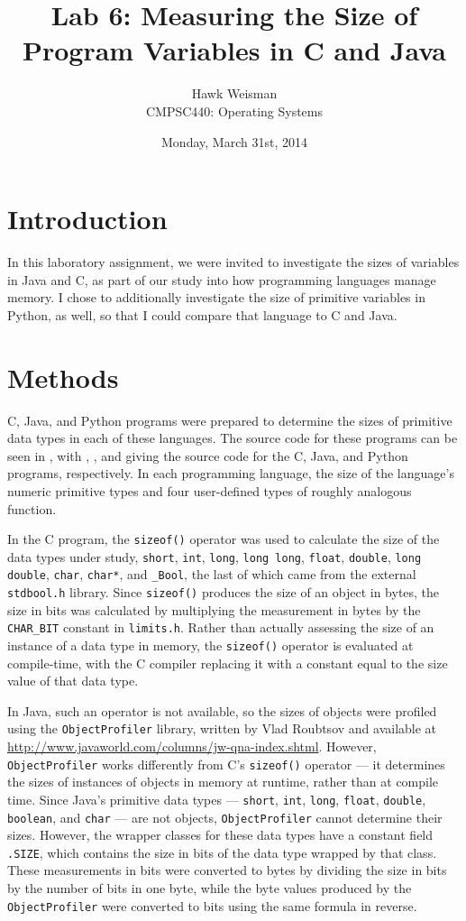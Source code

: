 \documentclass[12pt,letterpaper]{article}
\author{Hawk Weisman\\CMPSC440: Operating Systems}
\title{Lab 6: Measuring the Size of Program Variables in C and Java}
\date{Monday, March 31st, 2014}
\begin{document}
	\maketitle
	\section {Introduction}

		In this laboratory assignment, we were invited to investigate the sizes of variables in Java and C, as part of our study into how programming languages manage memory. I chose to additionally investigate the size of primitive variables in Python, as well, so that I could compare that language to C and Java.

	\section {Methods}
		
		C, Java, and Python programs were prepared to determine the sizes of primitive data types in each of these languages. The source code for these programs can be seen in , with , , and  giving the source code for the C, Java, and Python programs, respectively. In each programming language, the size of the language's numeric primitive types and four user-defined types of roughly analogous function.

		In the C program, the \texttt{sizeof()} operator was used to calculate the size of the data types under study, \texttt{short}, \texttt{int}, \texttt{long}, \texttt{long long}, \texttt{float}, \texttt{double}, \texttt{long double}, \texttt{char}, \texttt{char*}, and \texttt{\_Bool}, the last of which came from the external \texttt{stdbool.h} library. Since \texttt{sizeof()} produces the size of an object in bytes, the size in bits was calculated by multiplying the measurement in bytes by the \texttt{CHAR\_BIT} constant in \texttt{limits.h}. Rather than actually assessing the size of an instance of a data type in memory, the \texttt{sizeof()} operator is evaluated at compile-time, with the C compiler replacing it with a constant equal to the size value of that data type. 

		In Java, such an operator is not available, so the sizes of objects were profiled using the \texttt{ObjectProfiler} library, written by Vlad Roubtsov and available at \url{http://www.javaworld.com/columns/jw-qna-index.shtml}. However, \texttt{ObjectProfiler} works differently from C's \texttt{sizeof()} operator --- it determines  the sizes of instances of objects in memory at runtime, rather than at compile time. Since Java's primitive data types --- \texttt{short}, \texttt{int}, \texttt{long}, \texttt{float}, \texttt{double}, \texttt{boolean}, and \texttt{char} --- are not objects, \texttt{ObjectProfiler} cannot determine their sizes. However, the wrapper classes for these data types have a constant field \texttt{.SIZE}, which contains the size in bits of the data type wrapped by that class. These measurements in bits were converted to bytes by dividing the size in bits by the number of bits in one byte, while the byte values produced by the \texttt{ObjectProfiler} were converted to bits using the same formula in reverse.
\end{document}
